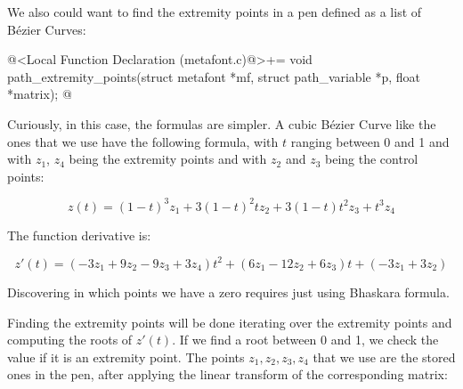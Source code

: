 {{{{{We also could want to find the extremity points in a pen defined as a
list of Bézier Curves:

\iniciocodigo
@<Local Function Declaration (metafont.c)@>+=
void path_extremity_points(struct metafont *mf, struct path_variable *p,
                           float *matrix);
@
\fimcodigo

Curiously, in this case, the formulas are simpler. A cubic Bézier
Curve like the ones that we use have the following formula, with $t$
ranging between 0 and 1 and with $z_1$, $z_4$ being the extremity
points and with $z_2$ and $z_3$ being the control points:

$$
z(t) = (1-t)^3z_1+3(1-t)^2tz_2+3(1-t)t^2z_3+t^3z_4
$$

The function derivative is:

$$
z'(t) = (-3z_1+9z_2-9z_3+3z_4)t^2+(6z_1-12z_2+6z_3)t+(-3z_1+3z_2)
$$

Discovering in which points we have a zero requires just using
Bhaskara formula.

Finding the extremity points will be done iterating over the extremity
points and computing the roots of $z'(t)$. If we find a root between 0
and 1, we check the value if it is an extremity point. The points
$z_1, z_2, z_3, z_4$ that we use are the stored ones in the pen, after
applying the linear transform of the corresponding matrix:

}}}}}
